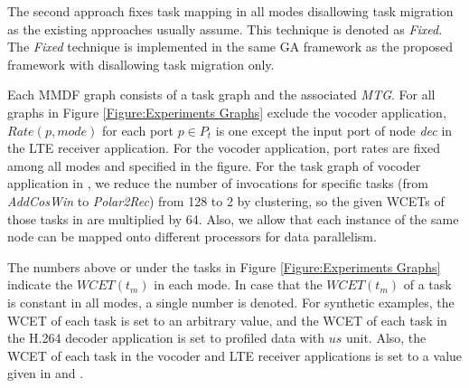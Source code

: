 \documentclass[prodmode,acmtecs]{acmsmall}
\begin{document}
The second approach fixes task mapping in all modes disallowing task migration as the existing approaches usually assume. This technique is denoted as \textit{Fixed}. The \textit{Fixed} technique is implemented in the same GA framework as the proposed framework with disallowing task migration only.

Each MMDF graph consists of a task graph and the associated \textit{MTG}. For all graphs in Figure \ref{Figure:Experiments Graphs} exclude the vocoder application, $Rate(p, mode)$ for each port $p \in P_t$ is one except the input port of node \textit{dec} in the LTE receiver application. For the vocoder application, port rates are fixed among all modes and specified in the figure. For the task graph of vocoder application in \cite{Zhai:2015}, we reduce the number of invocations for specific tasks (from \textit{AddCosWin} to \textit{Polar2Rec}) from 128 to 2 by clustering, so the given WCETs of those tasks in \cite{Zhai:2015} are multiplied by 64. Also, we allow that each instance of the same node can be mapped onto different processors for data parallelism.

The numbers above or under the tasks in Figure \ref{Figure:Experiments Graphs} indicate the $WCET(t_m)$ in each mode. In case that the $WCET(t_m)$ of a task is constant in all modes, a single number is denoted. For synthetic examples, the WCET of each task is set to an arbitrary value, and the WCET of each task in the H.264 decoder application is set to profiled data with $us$ unit. Also, the WCET of each task in the vocoder and LTE receiver applications is set to a value given in \cite{Zhai:2015} and \cite{Siyoum:2011}.
\end{document}
